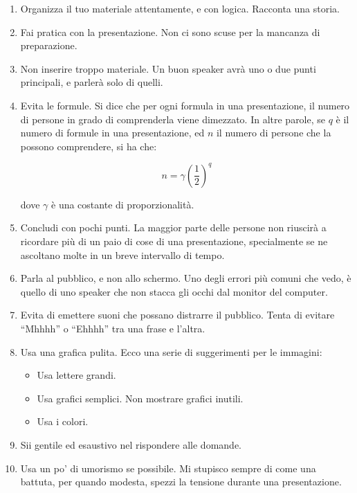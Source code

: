 \documentclass[12pt]{article}
\begin{document}
\begin{enumerate}

\item Organizza il tuo materiale attentamente, e con logica. Racconta una storia.

\item Fai pratica con la presentazione. Non ci sono scuse per la mancanza di preparazione.

\item Non inserire troppo materiale. Un buon speaker avr\`a uno o due punti principali, e parler\`a solo di quelli.

\item Evita le formule. Si dice che per ogni formula in una presentazione, il numero di persone in grado di comprenderla viene dimezzato. In altre parole, se $q$ è il numero di formule in una presentazione, ed $n$ il numero di persone che la possono comprendere, si ha che:

\begin{equation}
n = \gamma \left( \frac{1}{2} \right)^q
\end{equation}

dove $\gamma$ è una costante di proporzionalit\`a.

\item Concludi con pochi punti. La maggior parte delle persone non riuscir\`a a ricordare pi\`u di un paio di cose di una presentazione, specialmente se ne ascoltano molte in un breve intervallo di tempo.

\item Parla al pubblico, e non allo schermo. Uno degli errori pi\`u comuni che vedo, è quello di uno speaker che non stacca gli occhi dal monitor del computer.

\item Evita di emettere suoni che possano distrarre il pubblico. Tenta di evitare ``Mhhhh'' o ``Ehhhh'' tra una frase e l'altra.

\item Usa una grafica pulita. Ecco una serie di suggerimenti per le immagini:

\begin{itemize}

\item Usa lettere grandi.
\item Usa grafici semplici. Non mostrare grafici inutili.
\item Usa i colori.

\end{itemize}

\item Sii gentile ed esaustivo nel rispondere alle domande.

\item Usa un po' di umorismo se possibile. Mi stupisco sempre di come una battuta, per quando modesta, spezzi la tensione durante una presentazione.

\end{enumerate}
\end{document}
